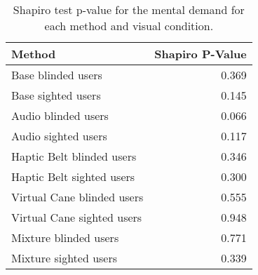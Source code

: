 
\begin{table}[!htb]
\centering
\caption{Shapiro test p-value for the mental demand for each method and visual condition.}
\label{tab:shapiro_mental_demand}
\begin{tabular}{lr}
\toprule
                    Method &  Shapiro P-Value \\
\midrule
        Base blinded users &            0.369 \\
        Base sighted users &            0.145 \\
       Audio blinded users &            0.066 \\
       Audio sighted users &            0.117 \\
 Haptic Belt blinded users &            0.346 \\
 Haptic Belt sighted users &            0.300 \\
Virtual Cane blinded users &            0.555 \\
Virtual Cane sighted users &            0.948 \\
     Mixture blinded users &            0.771 \\
     Mixture sighted users &            0.339 \\
\bottomrule
\end{tabular}
\end{table}

